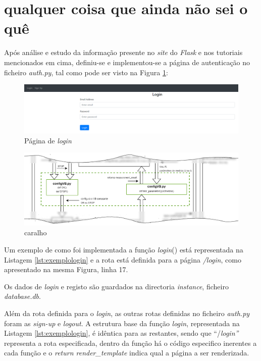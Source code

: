 \section{qualquer coisa que ainda não sei o quê}

Após análise e estudo da informação presente no \textit{site} do \textit{Flask} e nos tutoriais mencionados em cima, definiu-se e implementou-se a página de autenticação no ficheiro \textit{auth.py}, tal como pode ser visto na Figura \ref{fig:paglogin}:

\begin{figure}[hbtp]
	\centering
	\includegraphics[width=1\textwidth]{figures/login.png}
	\caption{Página de \textit{login}}
	\label{fig:paglogin}
\end{figure}

\begin{figure}[hbtp]
	\centering
	\includegraphics[width=1\textwidth]{figures/ohm_diagramaCUT.drawio.png}
	\caption{caralho}
	\label{fig:diagramaCUT}
\end{figure}

Um exemplo de como foi implementada a função \textit{login}() está representada na Listagem \ref{lst:exemplologin} e a rota está definida para a página \textit{/login}, como apresentado na mesma Figura, linha 17.

Os dados de \textit{login} e registo são guardados na directoria \textit{instance}, ficheiro \textit{database.db}.

Além da rota definida para o \textit{login}, as outras rotas definidas no ficheiro \textit{auth.py} foram as \textit{sign-up} e \textit{logout}. A estrutura base da função \textit{login}, representada na Listagem \ref{lst:exemplologin}, é idêntica para as restantes, sendo que ``/\textit{login''} representa a rota especificada, dentro da função há o código especifico inerentes a cada função e o \textit{return render\_template} indica qual a página a ser renderizada.

